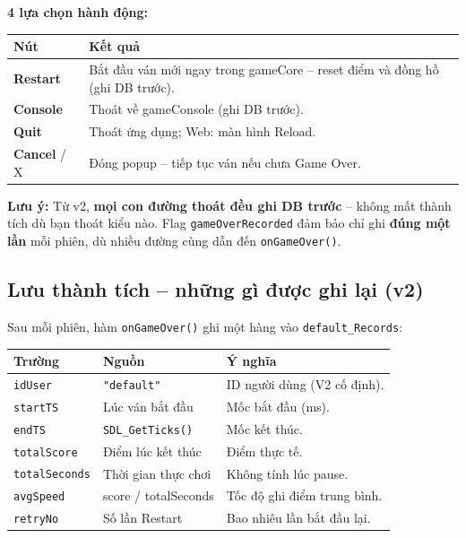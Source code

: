 \documentclass[12pt,a4paper]{article}
\renewcommand{\notebox}[1]{%
  \vspace{4pt}%
  \noindent\colorbox{cyan!12}{\begin{minipage}{0.96\linewidth}%
    \vspace{2pt}\textbf{Lưu ý:} #1\vspace{2pt}%
  \end{minipage}}%
  \vspace{4pt}%
}
\begin{document}
\noindent\textbf{4 lựa chọn hành động:}

\vspace{4pt}
\begin{tabularx}{\linewidth}{|l|X|}
    \hline
    \textbf{Nút}         & \textbf{Kết quả} \\
    \hline
    \textbf{Restart}     & Bắt đầu ván mới ngay trong gameCore -- reset điểm
                           và đồng hồ (ghi DB trước). \\
    \hline
    \textbf{Console}     & Thoát về gameConsole (ghi DB trước). \\
    \hline
    \textbf{Quit}        & Thoát ứng dụng; Web: màn hình Reload. \\
    \hline
    \textbf{Cancel} / X  & Đóng popup -- tiếp tục ván nếu chưa Game Over. \\
    \hline
\end{tabularx}

\notebox{Từ v2, \textbf{mọi con đường thoát đều ghi DB trước} -- không mất
thành tích dù bạn thoát kiểu nào. Flag \texttt{gameOverRecorded} đảm bảo
chỉ ghi \textbf{đúng một lần} mỗi phiên, dù nhiều đường cùng dẫn đến
\texttt{onGameOver()}.}

\subsection{Lưu thành tích -- những gì được ghi lại (v2)}

Sau mỗi phiên, hàm \texttt{onGameOver()} ghi một hàng vào
\texttt{default\_Records}:

\vspace{4pt}
\begin{tabularx}{\linewidth}{|l|l|X|}
    \hline
    \textbf{Trường}      & \textbf{Nguồn}            & \textbf{Ý nghĩa} \\
    \hline
    \texttt{idUser}      & \texttt{"default"}         & ID người dùng (V2 cố định). \\
    \hline
    \texttt{startTS}     & Lúc ván bắt đầu           & Mốc bắt đầu (ms). \\
    \hline
    \texttt{endTS}       & \texttt{SDL\_GetTicks()}  & Mốc kết thúc. \\
    \hline
    \texttt{totalScore}  & Điểm lúc kết thúc         & Điểm thực tế. \\
    \hline
    \texttt{totalSeconds}& Thời gian thực chơi       & Không tính lúc pause. \\
    \hline
    \texttt{avgSpeed}    & score / totalSeconds       & Tốc độ ghi điểm trung bình. \\
    \hline
    \texttt{retryNo}     & Số lần Restart             & Bao nhiêu lần bắt đầu lại. \\
    \hline
\end{tabularx}
\end{document}
